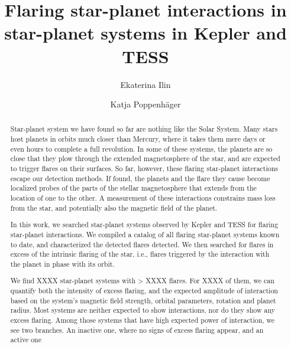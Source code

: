 \documentclass[twocolumn]{aastex631}
\begin{document}
\title{Flaring star-planet interactions in star-planet systems in Kepler and TESS}

\author{Ekaterina Ilin}
\author{Katja Poppenh\"ager}

\begin{abstract}
    Star-planet system we have found so far are nothing like the Solar System. Many stars host planets in orbits much closer than Mercury, where it takes them mere days or even hours to complete a full revolution. In some of these systems, the planets are so close that they plow through the extended magnetosphere of the star, and are expected to trigger flares on their surfaces. So far, however, these flaring star-planet interactions escape our detection methods. If found, the planets and the flare they cause become localized probes of the parts of the stellar magnetosphere that extends from the location of one to the other. A measurement of these interactions constrains mass loss from the star, and potentially also the magnetic field of the planet. 

    In this work, we searched star-planet systems observed by Kepler and TESS for flaring star-planet interactions. We compiled a catalog of all flaring star-planet systems known to date, and characterized the detected flares detected. We then searched for flares in excess of the intrinsic flaring of the star, i.e., flares triggered by the interaction with the planet in phase with its orbit. 

    We find XXXX star-planet systems with > XXXX flares. For XXXX of them, we can quantify both the intensity of excess flaring, and the expected amplitude of interaction based on the system's magnetic field strength, orbital parameters, rotation and planet radius. Most systems are neither expected to show interactions, nor do they show any excess flaring. Among those systems that have high expected power of interaction, we see two branches. An inactive one, where no signs of excess flaring appear, and an active one %
\end{abstract}

\end{document}
